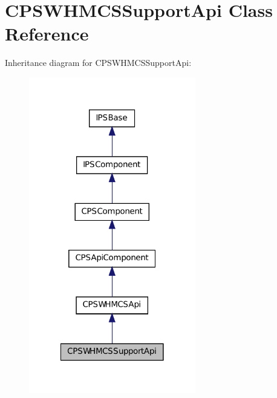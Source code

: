 \hypertarget{classCPSWHMCSSupportApi}{
\section{CPSWHMCSSupportApi Class Reference}
\label{classCPSWHMCSSupportApi}
}


Inheritance diagram for CPSWHMCSSupportApi:\nopagebreak
\begin{figure}[H]
\begin{center}
\leavevmode
\includegraphics[width=206pt]{classCPSWHMCSSupportApi__inherit__graph}
\end{center}
\end{figure}


